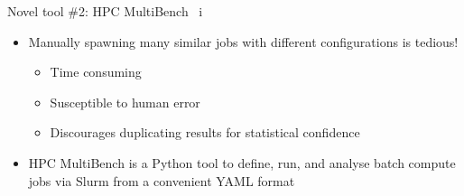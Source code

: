 \documentclass[10pt,aspectratio=169]{beamer}
\begin{document}



\begin{frame}{Novel tool \#2: HPC MultiBench \ i}
    \begin{itemize}
        \item<1-> Manually spawning many similar jobs with different configurations is tedious!
        \begin{itemize}
            \item Time consuming
            \item Susceptible to human error
            \item Discourages duplicating results for statistical confidence
        \end{itemize}
        \vspace{0.5cm}
        \item<2-> HPC MultiBench is a Python tool to define, run, and analyse batch compute jobs via Slurm from a convenient YAML format
    \end{itemize}
\end{frame}
\end{document}
